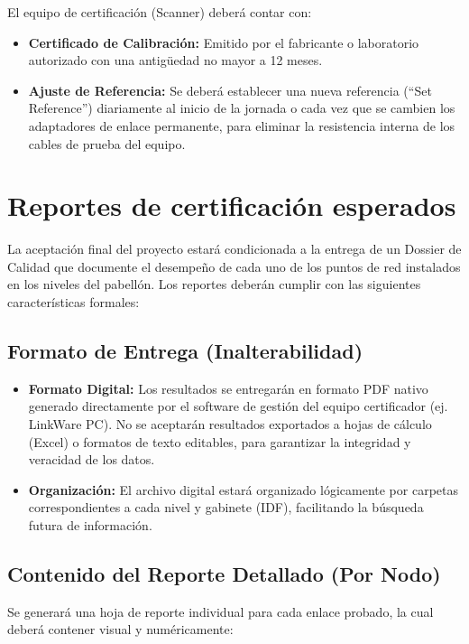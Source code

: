 El equipo de certificación (Scanner) deberá contar con:

\begin{itemize}
    \item \textbf{Certificado de Calibración:} Emitido por el fabricante o laboratorio autorizado con una antigüedad no mayor a 12 meses.
    \item \textbf{Ajuste de Referencia:} Se deberá establecer una nueva referencia (``Set Reference'') diariamente al inicio de la jornada o cada vez que se cambien los adaptadores de enlace permanente, para eliminar la resistencia interna de los cables de prueba del equipo.
\end{itemize}

\section{Reportes de certificación esperados}

La aceptación final del proyecto estará condicionada a la entrega de un Dossier de Calidad que documente el desempeño de cada uno de los \textbf{\totalPuntos{}} puntos de red instalados en los \totalPisos{} niveles del pabellón. Los reportes deberán cumplir con las siguientes características formales:

\subsection*{Formato de Entrega (Inalterabilidad)}

\begin{itemize}
    \item \textbf{Formato Digital:} Los resultados se entregarán en formato PDF nativo generado directamente por el software de gestión del equipo certificador (ej. LinkWare PC). No se aceptarán resultados exportados a hojas de cálculo (Excel) o formatos de texto editables, para garantizar la integridad y veracidad de los datos.
    \item \textbf{Organización:} El archivo digital estará organizado lógicamente por carpetas correspondientes a cada nivel y gabinete (IDF), facilitando la búsqueda futura de información.
\end{itemize}

\subsection*{Contenido del Reporte Detallado (Por Nodo)}

Se generará una hoja de reporte individual para cada enlace probado, la cual deberá contener visual y numéricamente:

